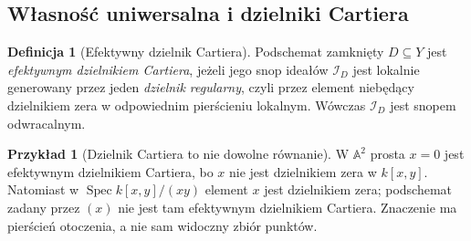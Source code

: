 \documentclass[11pt,a4paper,openany]{report}
\numberwithin{equation}{section}
\theoremstyle{plain}
\theoremstyle{definition}
\newtheorem{definicja}[twierdzenie]{Definicja}
\newtheorem{przyklad}[twierdzenie]{Przykład}
\theoremstyle{remark}
\newcommand{\A}{\mathbb A}
\newcommand{\Spec}{\operatorname{Spec}}
\begin{document}
\subsection{Własność uniwersalna i dzielniki Cartiera}

\begin{definicja}[Efektywny dzielnik Cartiera]
\label{def:ga5-cartier}
Podschemat zamknięty $D\subseteq Y$ jest \emph{efektywnym
dzielnikiem Cartiera}, jeżeli jego snop ideałów
$\mathcal I_D$ jest lokalnie generowany przez jeden
\emph{dzielnik regularny}, czyli przez element niebędący
dzielnikiem zera w odpowiednim pierścieniu lokalnym.
Wówczas $\mathcal I_D$ jest snopem odwracalnym.
\end{definicja}

\begin{przyklad}[Dzielnik Cartiera to nie dowolne równanie]
W $\A^2$ prosta $x=0$ jest efektywnym dzielnikiem Cartiera,
bo $x$ nie jest dzielnikiem zera w $k[x,y]$.
Natomiast w $\Spec k[x,y]/(xy)$ element $x$ jest dzielnikiem
zera; podschemat zadany przez $(x)$ nie jest tam efektywnym
dzielnikiem Cartiera. Znaczenie ma pierścień otoczenia,
a nie sam widoczny zbiór punktów.
\end{przyklad}
\end{document}
